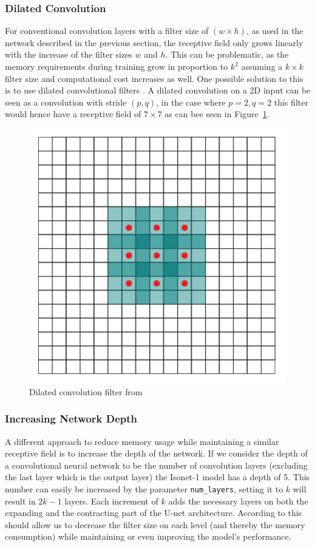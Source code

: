 \documentclass[a4paper, 12pt]{article} %
\begin{document}
\subsubsection{Dilated Convolution}
For conventional convolution layers with a filter size of $(w \times h)$, as used in the network described in the previous section, the receptive field only grows linearly with the increase of the filter sizes $w$ and $h$. This can be problematic, as the memory requirements during training grow in proportion to $k^2$ assuming a $k \times k$ filter size and computational cost increases as well. One possible solution to this is to use dilated convolutional filters \citep{ferenc-dilated}. A dilated convolution on a 2D input can be seen as a convolution with stride $(p, q)$, in the case where $p=2, q=2$ this filter would hence have a receptive field of $7 \times 7$ as can bee seen in Figure~\ref{fig:dilated}.
\begin{figure}[h]
    \center%
    \includegraphics[width=0.3\columnwidth]{figures/dilated.png}
    \caption{Dilated convolution filter from~\cite{ferenc-dilated}}\label{fig:dilated}
\end{figure}

\subsubsection{Increasing Network Depth}
A different approach to reduce memory usage while maintaining a similar receptive field is to increase the depth of the network. If we consider the depth of a convolutional neural network to be the number of convolution layers (excluding the last layer which is the output layer) the Isonet-1 model has a depth of 5. This number can easily be increased by the parameter \texttt{num\_layers}, setting it to $k$ will result in $2k-1$ layers. Each increment of $k$ adds the necessary layers on both the expanding and the contracting part of the U-net architecture. According to \citet{depth} this should allow us to decrease the filter size on each level (and thereby the memory consumption) while maintaining or even improving the model's performance.
\end{document}
